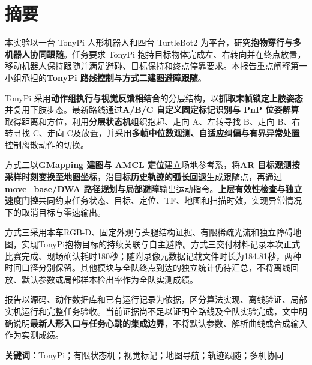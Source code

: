 \section*{摘要}
本实验以一台 TonyPi 人形机器人和四台 TurtleBot2 为平台，研究\textbf{抱物穿行与多机器人协同跟随}。任务要求 TonyPi 抱持目标物体完成左、右转向并在终点放置，移动机器人保持跟随并满足避碰、目标保持和终点停靠要求。本报告重点阐释第一小组承担的\textbf{TonyPi 路线控制}与\textbf{方式二建图避障跟随}。

TonyPi 采用\textbf{动作组执行与视觉反馈相结合}的分层结构，以\textbf{抓取末帧锁定上肢姿态}并复用下肢步态。最新路线通过\textbf{A/B/C 自定义固定标记识别与 PnP 位姿解算}取得距离和方位，利用\textbf{分层状态机}组织抱起、走向 A、左转寻找 B、走向 B、右转寻找 C、走向 C及放置，并采用\textbf{多帧中位数观测、自适应纠偏与有界异常处置}控制离散动作的切换。

方式二以\textbf{GMapping 建图与 AMCL 定位}建立场地参考系，将\textbf{AR 目标观测按采样时刻变换至地图坐标}，沿\textbf{目标历史轨迹的弧长回退}生成跟随点，再通过\textbf{move\_base/DWA 路径规划与局部避障}输出运动指令。\textbf{上层有效性检查与独立速度门控}共同约束任务状态、目标、定位、TF、地图和扫描时效，实现异常情况下的取消目标与零速输出。

方式三采用本车RGB-D、固定外观与头腿结构证据、有限稀疏光流和独立障碍地图，实现TonyPi抱物目标的持续关联与自主避障。方式三交付材料记录本次正式比赛完成、现场确认耗时180秒；随附录像元数据记载文件时长为184.81秒，两种时间口径分别保留。其他模块与全队终点到达的独立统计仍待汇总，不将离线回放、默认参数或局部样本检出率作为全队实测成绩。

报告以源码、动作数据库和已有运行记录为依据，区分算法实现、离线验证、局部实机运行和完整任务验收。当前证据尚不足以证明全路线及全队实验完成，文中明确说明\textbf{最新人形入口与任务心跳的集成边界}，不将默认参数、解析曲线或合成输入作为实测成绩。

\noindent\textbf{关键词：}TonyPi；有限状态机；视觉标记；地图导航；轨迹跟随；多机协同
